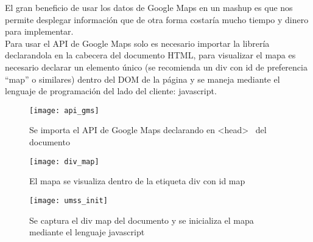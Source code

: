      El gran beneficio de usar los datos de Google Maps en un mashup es que nos permite desplegar información que de otra forma costaría mucho tiempo y dinero para implementar.\\

      Para usar el API de Google Maps solo es necesario importar la librería declarandola en la cabecera del documento HTML, para visualizar el mapa es necesario declarar un elemento único (se recomienda un div con id de preferencia ``map'' o similares) dentro del DOM de la página y se maneja mediante el lenguaje de programación del lado del cliente: javascript.\\

      \begin{figure}[!hbp]
        \begin{center}
          \texttt{[image: api\_gms]}
        \end{center}
        \caption[API de Google Maps declarado]{Se importa el API de Google Maps declarando en  <head>  ~del documento}
        \label{fig:api_gm}




      \end{figure}
      
      \begin{figure}[!hbp]
        \begin{center}
          \texttt{[image: div\_map]}
        \end{center}
        \caption[Div con id map para el Mapa]{El mapa se visualiza dentro de la etiqueta div con id map}
        \label{fig:div_map}
      \end{figure}


      \begin{figure}[!hbp]
        \begin{center}
          \texttt{[image: umss\_init]}
        \end{center}
        \caption[UMSS javascript]{Se captura el div map del documento y se inicializa el mapa mediante el lenguaje javascript}
        \label{fig:umss_js}
      \end{figure}



